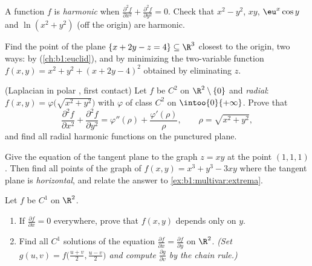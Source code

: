 \begin{exercise}[$\star\star$]\label{exo:b1:multivar:7}
A function $f$ is \emph{harmonic} when $\frac{\partial^2 f}{\partial
x^2} + \frac{\partial^2 f}{\partial y^2} = 0$. Check that $x^2 -
y^2$, $xy$, $\eu^x\cos y$ and $\ln(x^2 + y^2)$ (off the origin) are
harmonic.
\end{exercise}

\begin{exercise}[$\star\star\star$]\label{exo:b1:multivar:8}
Find the point of the plane $\{x + 2y - z = 4\} \subseteq \R^3$
closest to the origin, two ways: by 
(\cref{ch:b1:euclid}), and by minimizing the two-variable function
$f(x, y) = x^2 + y^2 + (x + 2y - 4)^2$ obtained by eliminating $z$.
\end{exercise}

\begin{exercise}[$\star\star\star$]\label{exo:b1:multivar:9}
(Laplacian in polar , first contact) Let $f$ be $C^2$ on
$\R^2 \setminus \{0\}$ and \emph{radial}: $f(x, y) =
\varphi\bigl(\sqrt{x^2+y^2}\bigr)$ with $\varphi$ of class $C^2$ on
$\intoo{0}{+\infty}$. Prove that
\[
\frac{\partial^2 f}{\partial x^2} + \frac{\partial^2 f}{\partial
y^2} = \varphi''(\rho) + \frac{\varphi'(\rho)}{\rho},
\qquad \rho = \sqrt{x^2 + y^2},
\]
and find all radial harmonic functions on the punctured plane.
\end{exercise}

\begin{exercise}[$\star\star$]\label{exo:b1:multivar:10}
Give the equation of the tangent plane to the graph $z = xy$ at
the point $(1, 1, 1)$. Then find all points of the graph of
$f(x,y) = x^3 + y^3 - 3xy$ where the tangent plane is
\emph{horizontal}, and relate the answer to
\cref{ex:b1:multivar:extrema}.
\end{exercise}

\begin{exercise}[$\star\star$]\label{exo:b1:multivar:11}
Let $f$ be $C^1$ on $\R^2$.
\begin{enumerate}
  \item If $\frac{\partial f}{\partial x} = 0$ everywhere, prove
        that $f(x, y)$ depends only on $y$.
  \item Find all $C^1$ solutions of the equation
        $\frac{\partial f}{\partial x} = \frac{\partial
        f}{\partial y}$ on $\R^2$. \emph{(Set $g(u, v) =
        f\bigl(\frac{u+v}2, \frac{u-v}2\bigr)$ and compute
        $\frac{\partial g}{\partial v}$ by the chain rule.)}
\end{enumerate}
\end{exercise}

